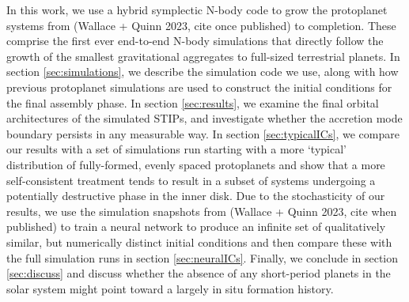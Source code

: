In this work, we use a hybrid symplectic N-body code to grow the protoplanet systems from (Wallace + Quinn 2023, cite once 
published) to completion. These comprise the first ever end-to-end N-body simulations that directly follow the growth of the 
smallest gravitational aggregates to full-sized terrestrial planets. In section \ref{sec:simulations}, we describe the simulation code 
we use, along with how previous protoplanet simulations are used to construct the initial conditions for the final assembly phase. In 
section \ref{sec:results}, we examine the final orbital architectures of the simulated STIPs, and investigate whether the accretion 
mode boundary persists in any measurable way. In section \ref{sec:typicalICs}, we compare our results with a set of simulations 
run starting with a more `typical' distribution of fully-formed, evenly spaced protoplanets and show that a more self-consistent 
treatment tends to result in a subset of systems undergoing a potentially destructive phase in the inner disk. Due to the 
stochasticity of our results, we use the simulation snapshots from (Wallace + Quinn 2023, cite when published) to train a neural 
network to produce an infinite set of qualitatively similar, but numerically distinct initial conditions and then compare these with the 
full simulation runs in section \ref{sec:neuralICs}. Finally, we conclude in section \ref{sec:discuss} and discuss whether the absence 
of any short-period planets in the solar system might point toward a largely in situ formation history.


